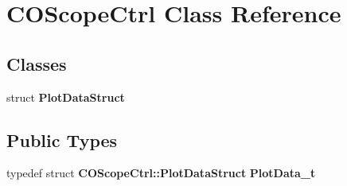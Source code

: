 \section{COScopeCtrl Class Reference}
\label{classCOScopeCtrl}
\subsection*{Classes}
\begin{DoxyCompactItemize}
\item 
struct {\bf PlotDataStruct}
\end{DoxyCompactItemize}
\subsection*{Public Types}
\begin{DoxyCompactItemize}
\item 
typedef struct {\bf COScopeCtrl::PlotDataStruct} {\bfseries PlotData\_\-t}\label{classCOScopeCtrl_a43f6a626190d91648a3f97c4e2b81978}

\end{DoxyCompactItemize}
